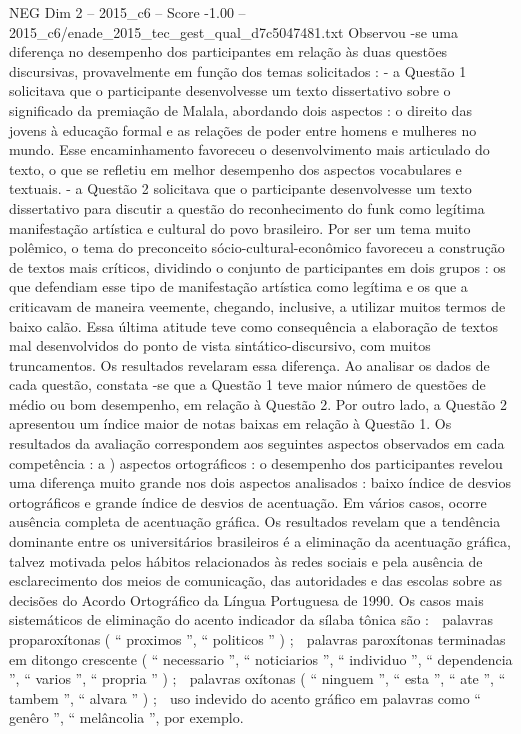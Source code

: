 \begin{textsample}{NEG Dim 2 – 2015\_c6 – Score -1.00 – 2015\_c6/enade\_2015\_tec\_gest\_qual\_d7c5047481.txt}
Observou -se uma diferença no desempenho dos participantes em relação às duas questões discursivas, provavelmente em função dos temas solicitados : - a Questão 1 solicitava que o participante desenvolvesse um texto dissertativo sobre o significado da premiação de Malala, abordando dois aspectos : o direito das jovens à educação formal e as relações de poder entre homens e mulheres no mundo.
Esse encaminhamento favoreceu o desenvolvimento mais articulado do texto, o que se refletiu em melhor desempenho dos aspectos vocabulares e textuais. - a Questão 2 solicitava que o participante desenvolvesse um texto dissertativo para discutir a questão do reconhecimento do funk como legítima manifestação artística e cultural do povo brasileiro.
Por ser um tema muito polêmico, o tema do preconceito sócio-cultural-econômico favoreceu a construção de textos mais críticos, dividindo o conjunto de participantes em dois grupos : os que defendiam esse tipo de manifestação artística como legítima e os que a criticavam de maneira veemente, chegando, inclusive, a utilizar muitos termos de baixo calão.
Essa última atitude teve como consequência a elaboração de textos mal desenvolvidos do ponto de vista sintático-discursivo, com muitos truncamentos.
Os resultados revelaram essa diferença.
Ao analisar os dados de cada questão, constata -se que a Questão 1 teve maior número de questões de médio ou bom desempenho, em relação à Questão 2.
Por outro lado, a Questão 2 apresentou um índice maior de notas baixas em relação à Questão 1.
Os resultados da avaliação correspondem aos seguintes aspectos observados em cada competência : a ) aspectos ortográficos : o desempenho dos participantes revelou uma diferença muito grande nos dois aspectos analisados : baixo índice de desvios ortográficos e grande índice de desvios de acentuação.
Em vários casos, ocorre ausência completa de acentuação gráfica.
Os resultados revelam que a tendência dominante entre os universitários brasileiros é a eliminação da acentuação gráfica, talvez motivada pelos hábitos relacionados às redes sociais e pela ausência de esclarecimento dos meios de comunicação, das autoridades e das escolas sobre as decisões do Acordo Ortográfico da Língua Portuguesa de 1990.
Os casos mais sistemáticos de eliminação do acento indicador da sílaba tônica são :  palavras proparoxítonas ( “ proximos ”, “ politicos ” ) ;  palavras paroxítonas terminadas em ditongo crescente ( “ necessario ”, “ noticiarios ”, “ individuo ”, “ dependencia ”, “ varios ”, “ propria ” ) ;  palavras oxítonas ( “ ninguem ”, “ esta ”, “ ate ”, “ tambem ”, “ alvara ” ) ;  uso indevido do acento gráfico em palavras como “ genêro ”, “ melâncolia ”, por exemplo.

\end{textsample}
